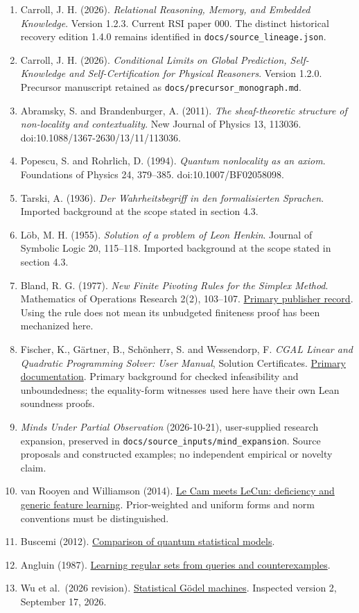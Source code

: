 \documentclass[
  10pt,
]{article}
\begin{document}
\begin{enumerate}
\def\labelenumi{\arabic{enumi}.}
\item
  Carroll, J. H. (2026). \emph{Relational Reasoning, Memory, and Embedded Knowledge}. Version 1.2.3. Current RSI paper 000. The distinct historical recovery edition 1.4.0 remains identified in \texttt{docs/source\_lineage.json}.
\item
  Carroll, J. H. (2026). \emph{Conditional Limits on Global Prediction, Self-Knowledge and Self-Certification for Physical Reasoners}. Version 1.2.0. Precursor manuscript retained as \texttt{docs/precursor\_monograph.md}.
\item
  Abramsky, S. and Brandenburger, A. (2011). \emph{The sheaf-theoretic structure of non-locality and contextuality}. New Journal of Physics 13, 113036. doi:10.1088/1367-2630/13/11/113036.
\item
  Popescu, S. and Rohrlich, D. (1994). \emph{Quantum nonlocality as an axiom}. Foundations of Physics 24, 379--385. doi:10.1007/BF02058098.
\item
  Tarski, A. (1936). \emph{Der Wahrheitsbegriff in den formalisierten Sprachen}. Imported background at the scope stated in section 4.3.
\item
  Löb, M. H. (1955). \emph{Solution of a problem of Leon Henkin}. Journal of Symbolic Logic 20, 115--118. Imported background at the scope stated in section 4.3.
\item
  Bland, R. G. (1977). \emph{New Finite Pivoting Rules for the Simplex Method}. Mathematics of Operations Research 2(2), 103--107. \href{https://doi.org/10.1287/moor.2.2.103}{Primary publisher record}. Using the rule does not mean its unbudgeted finiteness proof has been mechanized here.
\item
  Fischer, K., Gärtner, B., Schönherr, S. and Wessendorp, F. \emph{CGAL Linear and Quadratic Programming Solver: User Manual}, Solution Certificates. \href{https://doc.cgal.org/latest/QP_solver/index.html}{Primary documentation}. Primary background for checked infeasibility and unboundedness; the equality-form witnesses used here have their own Lean soundness proofs.
\item
  \emph{Minds Under Partial Observation} (2026-10-21), user-supplied research expansion, preserved in \texttt{docs/source\_inputs/mind\_expansion}. Source proposals and constructed examples; no independent empirical or novelty claim.
\item
  van Rooyen and Williamson (2014). \href{https://arxiv.org/abs/1402.4884}{Le Cam meets LeCun: deficiency and generic feature learning}. Prior-weighted and uniform forms and norm conventions must be distinguished.
\item
  Buscemi (2012). \href{https://arxiv.org/abs/1004.3794v4}{Comparison of quantum statistical models}.
\item
  Angluin (1987). \href{https://doi.org/10.1016/0890-5401(87)90052-6}{Learning regular sets from queries and counterexamples}.
\item
  Wu et al.~(2026 revision). \href{https://arxiv.org/abs/2510.10232v2}{Statistical Gödel machines}. Inspected version 2, September 17, 2026.
\end{enumerate}
\end{document}

